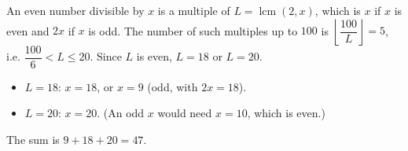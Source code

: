 An even number divisible by $x$ is a multiple of $L=\operatorname{lcm}(2,x)$, which is $x$ if $x$ is even and $2x$ if $x$ is odd. The number of such multiples up to $100$ is $\left\lfloor\dfrac{100}{L}\right\rfloor=5$, i.e. $\dfrac{100}{6}<L\le20$. Since $L$ is even, $L=18$ or $L=20$.
\begin{itemize}
\item $L=18$: $x=18$, or $x=9$ (odd, with $2x=18$).
\item $L=20$: $x=20$. (An odd $x$ would need $x=10$, which is even.)
\end{itemize}
The sum is $9+18+20=\boxed{47}$.
